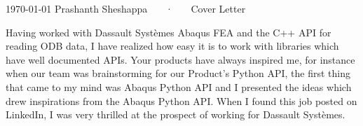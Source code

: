 \documentclass[11pt, a4paper]{awesome-cv}
\newcommand{\company}{Dassault Syst\`emes}
\begin{document}
\makecvheader[R]

\makecvfooter
  {\today}
  {Prashanth Sheshappa ~~~·~~~ Cover Letter}
  {}

\makelettertitle

\begin{cvletter}


Having worked with \company{} Abaqus FEA and the C++ API for reading ODB data, 
I have realized how easy it is to work with libraries which have well documented APIs. 
Your products have always inspired me, for instance when our team was brainstorming for 
our Product's Python API, the first thing that came to my mind was Abaqus Python API and 
I presented the ideas which drew inspirations from the Abaqus Python API. 
When I found this job posted on LinkedIn, I was very thrilled at the prospect of working 
for \company{}.



\end{cvletter}
\end{document}
